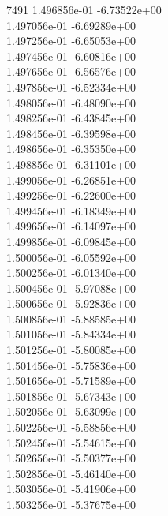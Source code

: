 7491	1.496856e-01	-6.73522e+00	\\ 	1.497056e-01	-6.69289e+00	\\ 	1.497256e-01	-6.65053e+00	\\ 	1.497456e-01	-6.60816e+00	\\ 	1.497656e-01	-6.56576e+00	\\ 	1.497856e-01	-6.52334e+00	\\ 	1.498056e-01	-6.48090e+00	\\ 	1.498256e-01	-6.43845e+00	\\ 	1.498456e-01	-6.39598e+00	\\ 	1.498656e-01	-6.35350e+00	\\ 	1.498856e-01	-6.31101e+00	\\ 	1.499056e-01	-6.26851e+00	\\ 	1.499256e-01	-6.22600e+00	\\ 	1.499456e-01	-6.18349e+00	\\ 	1.499656e-01	-6.14097e+00	\\ 	1.499856e-01	-6.09845e+00	\\ 	1.500056e-01	-6.05592e+00	\\ 	1.500256e-01	-6.01340e+00	\\ 	1.500456e-01	-5.97088e+00	\\ 	1.500656e-01	-5.92836e+00	\\ 	1.500856e-01	-5.88585e+00	\\ 	1.501056e-01	-5.84334e+00	\\ 	1.501256e-01	-5.80085e+00	\\ 	1.501456e-01	-5.75836e+00	\\ 	1.501656e-01	-5.71589e+00	\\ 	1.501856e-01	-5.67343e+00	\\ 	1.502056e-01	-5.63099e+00	\\ 	1.502256e-01	-5.58856e+00	\\ 	1.502456e-01	-5.54615e+00	\\ 	1.502656e-01	-5.50377e+00	\\ 	1.502856e-01	-5.46140e+00	\\ 	1.503056e-01	-5.41906e+00	\\ 	1.503256e-01	-5.37675e+00	\\ \hline
